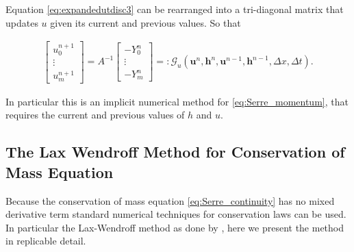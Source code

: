 \documentclass[SingleSpace,12pt,Journal]{Serre_ASCE}
\begin{document}
Equation \eqref{eq:expandedutdisc3} can be rearranged into a tri-diagonal matrix that updates $u$ given its current and previous values. So that
\begin{linenomath*}
\begin{gather}
\left[\begin{array}{c}
 u^{n+1}_0 \\
 \vdots \\
 u^{n+1}_m \end{array}\right]
 = A^{-1} \left[\begin{array}{c}
  -Y^n_0 \\
  \vdots \\
  -Y^n_m \end{array}\right] =: \mathcal{G}_u\left(\boldsymbol{u}^n,\boldsymbol{h}^n, \boldsymbol{u}^{n-1},\boldsymbol{h}^{n-1}, \Delta x, \Delta t \right).
\label{eq:FDcentforu}
\end{gather}
\end{linenomath*}
In particular this is an implicit numerical method for \eqref{eq:Serre_momentum}, that requires the current and previous values of $h$ and $u$.


\subsection{The Lax Wendroff Method for Conservation of Mass Equation}
\label{section:}
Because the conservation of mass equation \eqref{eq:Serre_continuity} has no mixed derivative term standard numerical techniques for conservation laws can be used. In particular the Lax-Wendroff method as done by , here we present the method in replicable detail.
\end{document}
